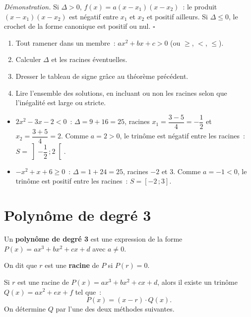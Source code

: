 \noindent\textit{D\'emonstration.} Si $\Delta>0$, $f(x)=a(x-x_1)(x-x_2)$~:
le produit $(x-x_1)(x-x_2)$ est n\'egatif entre $x_1$ et $x_2$ et positif ailleurs.
Si $\Delta\leq0$, le crochet de la forme canonique est positif ou nul. \hfill$\square$

\begin{methode}
\begin{enumerate}
  \item Tout ramener dans un membre~: $ax^2+bx+c>0$ (ou $\geq$, $<$, $\leq$).
  \item Calculer $\Delta$ et les racines \'eventuelles.
  \item Dresser le tableau de signe gr\^ace au th\'eor\`eme pr\'ec\'edent.
  \item Lire l'ensemble des solutions, en incluant ou non les racines selon
        que l'in\'egalit\'e est large ou stricte.
\end{enumerate}
\end{methode}

\begin{ex}
\begin{itemize}
  \item $2x^2-3x-2<0$~: $\Delta=9+16=25$, racines $x_1=\dfrac{3-5}{4}=-\dfrac12$ et
        $x_2=\dfrac{3+5}{4}=2$. Comme $a=2>0$, le trin\^ome est n\'egatif entre les
        racines~: $S=\left]-\dfrac12\,;2\right[$.
  \item $-x^2+x+6\geq0$~: $\Delta=1+24=25$, racines $-2$ et $3$. Comme $a=-1<0$,
        le trin\^ome est positif entre les racines~: $S=[-2\,;3]$.
\end{itemize}
\end{ex}

\section{Polyn\^ome de degr\'e 3}

\begin{defn}
Un \textbf{polyn\^ome de degr\'e 3} est une expression de la forme
$P(x) = ax^3 + bx^2 + cx + d$ avec $a \ne 0$.

On dit que $r$ est une \textbf{racine} de $P$ si $P(r) = 0$.
\end{defn}

\begin{thm}
Si $r$ est une racine de $P(x) = ax^3+bx^2+cx+d$, alors il existe un
trin\^ome $Q(x) = ax^2 + ex + f$ tel que~:
$$P(x) = (x - r)\cdot Q(x).$$
On d\'etermine $Q$ par l'une des deux m\'ethodes suivantes.
\end{thm}

